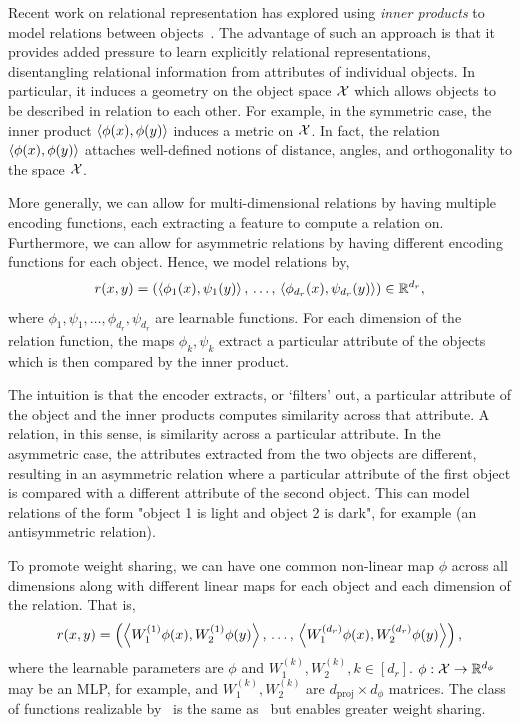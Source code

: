 Recent work on relational representation has explored using \textit{inner products} to model relations between objects~\citep{webbEmergentSymbols2021, kergNeuralArchitecture2022, altabaaAbstractorsTransformer2023}. The advantage of such an approach is that it provides added pressure to learn explicitly relational representations, disentangling relational information from attributes of individual objects. In particular, it induces a geometry on the object space ${\mathcal{X}}$ which allows objects to be described in relation to each other. For example, in the symmetric case, the inner product $\left \langle \phi(x), \phi(y) \right\rangle$ induces a metric on ${\mathcal{X}}$. In fact, the relation $\left \langle \phi(x), \phi(y) \right\rangle$ attaches well-defined notions of distance, angles, and orthogonality to the space ${\mathcal{X}}$.

More generally, we can allow for multi-dimensional relations by having multiple encoding functions, each extracting a feature to compute a relation on. Furthermore, we can allow for asymmetric relations by having different encoding functions for each object. Hence, we model relations by,
\begin{equation}\label{eq:relation_function}
    r(x, y) = \left(
        \left \langle \phi_1(x), \psi_1(y) \right\rangle,\, \ldots,\, \left \langle \phi_{d_r}(x), \psi_{d_r}(y) \right\rangle\right) \in \mathbb{R}^{d_r},
\end{equation}
where $\phi_1, \psi_1, \ldots, \phi_{d_r}, \psi_{d_r}$ are learnable functions. For each dimension of the relation function, the maps $\phi_k, \psi_k$ extract a particular attribute of the objects which is then compared by the inner product.

The intuition is that the encoder extracts, or `filters' out, a particular attribute of the object and the inner products computes similarity across that attribute. A relation, in this sense, is similarity across a particular attribute. In the asymmetric case, the attributes extracted from the two objects are different, resulting in an asymmetric relation where a particular attribute of the first object is compared with a different attribute of the second object. This can model relations of the form "object 1 is light and object 2 is dark", for example (an antisymmetric relation).

To promote weight sharing, we can have one common non-linear map $\phi$ across all dimensions along with different linear maps for each object and each dimension of the relation. That is,
\begin{equation}\label{eq:relation_function_lin_proj}
    r(x, y) = \left(\left \langle W_1^{(1)}\phi(x), W_2^{(1)}\phi(y) \right\rangle,\, \ldots,\, \left \langle W_1^{(d_r)}\phi(x), W_2^{(d_r)}\phi(y) \right\rangle\right),
\end{equation}
where the learnable parameters are $\phi$ and $W_1^{(k)}, W_2^{(k)}, k \in [d_r]$. $\phi: {\mathcal{X}} \to \mathbb{R}^{d_\phi}$ may be an MLP, for example, and $W_1^{(k)}, W_2^{(k)}$ are $d_{\mathrm{proj}} \times d_\phi$ matrices. The class of functions realizable by~ is the same as~ but enables greater weight sharing.

